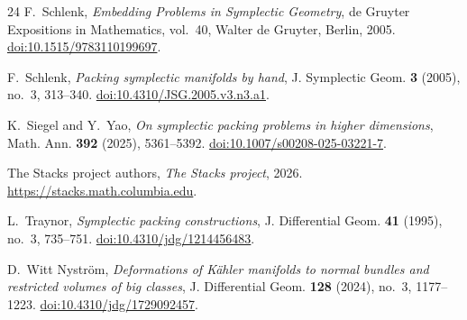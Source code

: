 \begin{thebibliography}{24}
F.~Schlenk,
\emph{Embedding Problems in Symplectic Geometry},
de Gruyter Expositions in Mathematics, vol.~40,
Walter de Gruyter, Berlin, 2005.
\href{https://doi.org/10.1515/9783110199697}{doi:10.1515/9783110199697}.

F.~Schlenk,
\emph{Packing symplectic manifolds by hand},
J. Symplectic Geom. \textbf{3} (2005), no.~3, 313--340.
\href{https://doi.org/10.4310/JSG.2005.v3.n3.a1}{doi:10.4310/JSG.2005.v3.n3.a1}.

K.~Siegel and Y.~Yao,
\emph{On symplectic packing problems in higher dimensions},
Math. Ann. \textbf{392} (2025), 5361--5392.
\href{https://doi.org/10.1007/s00208-025-03221-7}
{doi:10.1007/s00208-025-03221-7}.

The Stacks project authors,
\emph{The Stacks project}, 2026.
\url{https://stacks.math.columbia.edu}.

L.~Traynor,
\emph{Symplectic packing constructions},
J. Differential Geom. \textbf{41} (1995), no.~3, 735--751.
\href{https://doi.org/10.4310/jdg/1214456483}{doi:10.4310/jdg/1214456483}.

D.~Witt Nystr\"om,
\emph{Deformations of K\"ahler manifolds to normal bundles and
restricted volumes of big classes},
J. Differential Geom. \textbf{128} (2024), no.~3, 1177--1223.
\href{https://doi.org/10.4310/jdg/1729092457}
{doi:10.4310/jdg/1729092457}.

\end{thebibliography}
